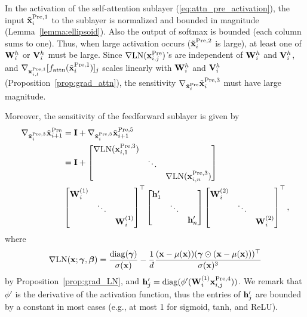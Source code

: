 \documentclass[journal]{IEEEtran}
\newcommand{\bfI}{{\bf I}}
\newcommand{\bfV}{{\bf V}}
\newcommand{\bfW}{{\bf W}}
\newcommand{\bfh}{{\bf h}}
\newcommand{\bfx}{{\bf x}}
\newcommand{\bfgamma}{{\boldsymbol \gamma}}
\newcommand{\bfbeta}{{\boldsymbol \beta}}
\theoremstyle{plain}
\theoremstyle{definition}
\theoremstyle{remark}
\begin{document}
In the activation of the self-attention sublayer (\ref{eq:attn_pre_activation}), the input $\tilde{\bfx}^{\rm Pre, 1}_i$ to the sublayer is normalized and bounded in magnitude (Lemma~\ref{lemma:ellipsoid}). Also the output of softmax is bounded (each column sums to one). Thus, when large activation occurs ($\tilde{\bfx}^{\rm Pre, 2}_i$ is large), at least one of $\bfW_{i}^{h}$ or $\bfV_{i}^{h}$ must be large. Since $\nabla {\rm LN}(\bfx^{{\rm Pre}}_{i, j})$'s are independent of $\bfW_{i}^{h}$ and $\bfV_{i}^{h}$, and $\nabla_{\bfx^{{\rm Pre},1}_{i, l}} [f_{\rm attn}(\tilde{\bfx}^{{\rm Pre},1}_{i})]_j$ scales linearly with $\bfW_{i}^{h}$ and $\bfV_{i}^{h}$ (Proposition~\ref{prop:grad_attn}), the sensitivity $\nabla_{\tilde{\bfx}_i^{{\rm Pre}}} \tilde{\bfx}_i^{{\rm Pre}, 3}$ must have large magnitude.


Moreover, the sensitivity of the feedforward sublayer is given by
\begin{align}
   \nabla_{\tilde{\bfx}_i^{{\rm Pre}, 3}} \tilde{\bfx}_{i+1}^{{\rm Pre}} &= \bfI + \nabla_{\tilde{\bfx}_i^{{\rm Pre}, 3}} \tilde{\bfx}_{i+1}^{{\rm Pre, 5}} \\
   &= \bfI 
   +  \begin{bmatrix}
\nabla {\rm LN}(\bfx^{{\rm Pre}, 3}_{i, 1}) &        &        \\
                 & \ddots &        \\
                 &        & \nabla {\rm LN}(\bfx^{{\rm Pre}, 3}_{i, n})
\end{bmatrix} \\
&\begin{bmatrix}
\bfW_{i}^{(1)} &        &        \\
                 & \ddots &        \\
                 &        & \bfW_{i}^{(1)}
\end{bmatrix}^\top
   \begin{bmatrix}
\bfh'_1 &        &        \\
                 & \ddots &        \\
                 &        & \bfh'_n
\end{bmatrix}
\begin{bmatrix}
\bfW_{i}^{(2)} &        &        \\
                 & \ddots &        \\
                 &        & \bfW_{i}^{(2)}
\end{bmatrix}^\top,
\end{align}
where
\begin{equation}
\nabla {\rm LN}(\bfx; \bfgamma, \bfbeta) = \frac{{\rm diag}(\bfgamma)}{\sigma(\bfx)} - \frac{1}{d} \frac{(\bfx-\mu(\bfx))(\bfgamma \odot (\bfx-\mu(\bfx)))^\top}{\sigma(\bfx)^3}
\end{equation}
by Proposition~\ref{prop:grad_LN}, and $\bfh'_j = {\rm diag} (\phi' ( \bfW_{i}^{(1)}\bfx^{{\rm Pre}, 4}_{i,j}  ))
$. We remark that $\phi'$ is the derivative of the activation function, thus the entries of $\bfh'_j$ are bounded by a constant in most cases (e.g., at most 1 for sigmoid, tanh, and ReLU).
\end{document}
